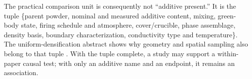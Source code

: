 The practical comparison unit is consequently not ``additive present.'' It is the tuple \{parent powder, nominal and measured additive content, mixing, green-body state, firing schedule and atmosphere, cover\slash crucible, phase assemblage, density basis, boundary characterization, conductivity type and temperature\}. The uniform-densification abstract shows why geometry and spatial sampling also belong to that tuple \cite{guo2023uniform}. With the tuple complete, a study may support a within-paper causal test; with only an additive name and an endpoint, it remains an association.
